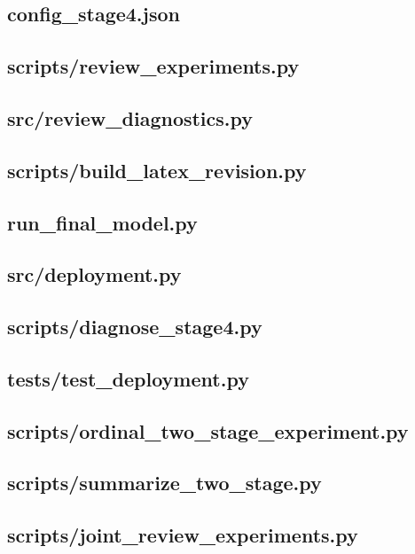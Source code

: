 \documentclass{mathorcup-journal}
\begin{document}
\subsection*{config\_stage4.json}

\subsection*{scripts/review\_experiments.py}

\subsection*{src/review\_diagnostics.py}

\subsection*{scripts/build\_latex\_revision.py}

\subsection*{run\_final\_model.py}

\subsection*{src/deployment.py}

\subsection*{scripts/diagnose\_stage4.py}

\subsection*{tests/test\_deployment.py}

\subsection*{scripts/ordinal\_two\_stage\_experiment.py}

\subsection*{scripts/summarize\_two\_stage.py}

\subsection*{scripts/joint\_review\_experiments.py}

\end{document}
